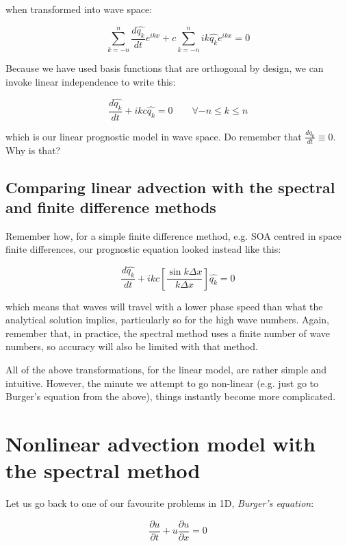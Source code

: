 when transformed into wave space:

\begin{equation}
  \sum_{k=-n}^{n} 	\frac{d \widehat{q_k}}{d t}  e^{ikx}+ c  \sum_{k=-n}^{n} 	ik \widehat{q_k} e^{ikx}= 0
\end{equation}

Because we have used basis functions that are orthogonal by design, we can invoke linear independence to write this:

\begin{equation}
	\frac{d \widehat{q_k}}{d t}  + ikc   \widehat{q_k} = 0  \qquad  \forall -n \le k \le n
	\label{spectral_linear_advection}
\end{equation}

which is our linear prognostic model in wave space. Do remember that $\frac{dq_0}{dt} \equiv 0$. Why is that?


\subsection{Comparing linear advection with the spectral and finite difference methods}
Remember how, for a simple finite difference method, e.g. SOA centred in space finite differences, our prognostic equation looked instead like this:

\begin{equation}
	\frac{d \widehat{q_k}}{d t}  + ikc \left[   \frac {\sin k \Delta x}{k\Delta x}  \right]  \widehat{q_k} = 0 
	\label{FD_linear_advection}
\end{equation}

which means that waves will travel with a lower phase speed than what the analytical solution implies, particularly so for the high wave numbers. Again, remember that, in practice, the spectral method uses a finite number of wave numbers, so accuracy will also be limited with that method.

All of the above transformations, for the linear model, are rather simple and intuitive. However, the minute we attempt to go non-linear (e.g. just go to Burger's equation from the above), things instantly become more complicated.

\section{Nonlinear advection model with the spectral method}
Let us go back to one of our favourite problems in 1D, \emph{Burger's equation}:

\begin{equation}
	\frac{\partial u}{\partial t} + u	\frac{\partial u}{\partial x} = 0
\end{equation}

